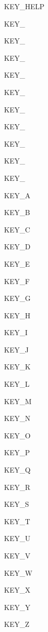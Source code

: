  KEY\_\-HELP \par
 \par
 KEY\_ \par
 KEY\_ \par
 KEY\_ \par
 KEY\_ \par
 KEY\_ \par
 KEY\_ \par
 KEY\_ \par
 KEY\_ \par
 KEY\_ \par
 KEY\_ \par
 \par
 KEY\_\-A \par
 KEY\_\-B \par
 KEY\_\-C \par
 KEY\_\-D \par
 KEY\_\-E \par
 KEY\_\-F \par
 KEY\_\-G \par
 KEY\_\-H \par
 KEY\_\-I \par
 KEY\_\-J \par
 KEY\_\-K \par
 KEY\_\-L \par
 KEY\_\-M \par
 KEY\_\-N \par
 KEY\_\-O \par
 KEY\_\-P \par
 KEY\_\-Q \par
 KEY\_\-R \par
 KEY\_\-S \par
 KEY\_\-T \par
 KEY\_\-U \par
 KEY\_\-V \par
 KEY\_\-W \par
 KEY\_\-X \par
 KEY\_\-Y \par
 KEY\_\-Z \par


